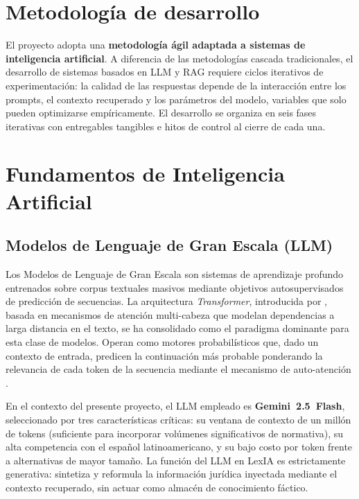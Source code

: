 \documentclass[12pt, letterpaper]{report}
\begin{document}
\section{Metodolog\'{i}a de desarrollo}

El proyecto adopta una \textbf{metodolog\'{i}a \'{a}gil adaptada a sistemas de inteligencia artificial}. A diferencia de las metodolog\'{i}as cascada tradicionales, el desarrollo de sistemas basados en LLM y RAG requiere ciclos iterativos de experimentaci\'{o}n: la calidad de las respuestas depende de la interacci\'{o}n entre los prompts, el contexto recuperado y los par\'{a}metros del modelo, variables que solo pueden optimizarse emp\'{i}ricamente. El desarrollo se organiza en seis fases iterativas con entregables tangibles e hitos de control al cierre de cada una.

\section{Fundamentos de Inteligencia Artificial}

\subsection{Modelos de Lenguaje de Gran Escala (LLM)}

Los Modelos de Lenguaje de Gran Escala son sistemas de aprendizaje profundo entrenados sobre corpus textuales masivos mediante objetivos autosupervisados de predicci\'{o}n de secuencias. La arquitectura \textit{Transformer}, introducida por \textcite{vaswani2017}, basada en mecanismos de atenci\'{o}n multi-cabeza que modelan dependencias a larga distancia en el texto, se ha consolidado como el paradigma dominante para esta clase de modelos. Operan como motores probabil\'{i}sticos que, dado un contexto de entrada, predicen la continuaci\'{o}n m\'{a}s probable ponderando la relevancia de cada token de la secuencia mediante el mecanismo de auto-atenci\'{o}n \cite{russell2010}.

En el contexto del presente proyecto, el LLM empleado es \textbf{Gemini~2.5~Flash}, seleccionado por tres caracter\'{i}sticas cr\'{i}ticas: su ventana de contexto de un mill\'{o}n de tokens (suficiente para incorporar vol\'{u}menes significativos de normativa), su alta competencia con el espa\~{n}ol latinoamericano, y su bajo costo por token frente a alternativas de mayor tama\~{n}o. La funci\'{o}n del LLM en LexIA es estrictamente generativa: sintetiza y reformula la informaci\'{o}n jur\'{i}dica inyectada mediante el contexto recuperado, sin actuar como almac\'{e}n de conocimiento f\'{a}ctico.
\end{document}
